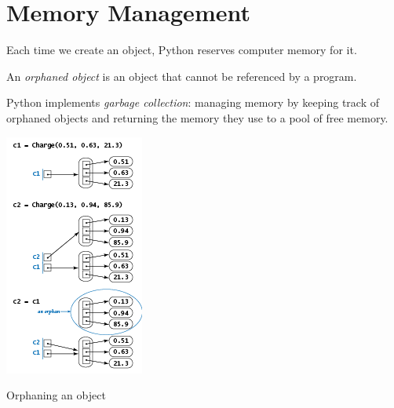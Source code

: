 \documentclass[8pt,a4paper,compress,handout]{beamer}
\begin{document}
\section{Memory Management}
\begin{frame}[fragile]
\begin{minipage}{200pt}
Each time we create an object, Python reserves computer memory for it.

\bigskip

An \emph{orphaned object} is an object that cannot be referenced by a program.

\bigskip

Python implements \emph{garbage collection}: managing memory by keeping track of orphaned objects and returning the memory they use to a pool of free memory.
\end{minipage}%
\begin{minipage}{100pt}
\begin{center}
\includegraphics[scale=0.45]{figures/orphaning.png}

\smallskip

\tiny Orphaning an object
\end{center}
\end{minipage}
\end{frame}
\end{document}
